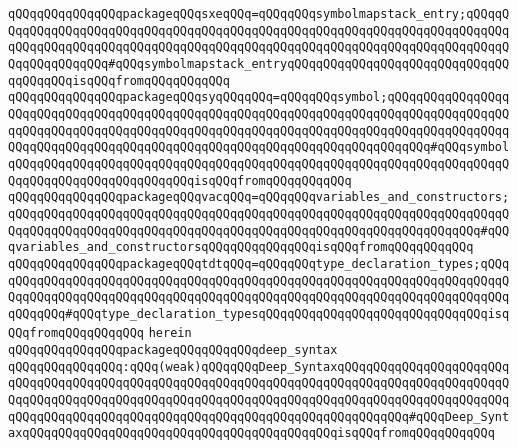 \verb|qQQqqQQqqQQqqQQqpackageqQQqsxeqQQq=qQQqqQQqsymbolmapstack_entry;qQQqqQQqqQQqqQQqqQQqqQQqqQQqqQQqqQQqqQQqqQQqqQQqqQQqqQQqqQQqqQQqqQQqqQQqqQQqqQQqqQQqqQQqqQQqqQQqqQQqqQQqqQQqqQQqqQQqqQQqqQQqqQQqqQQqqQQqqQQqqQQqqQQqqQQqqQQqqQQq#qQQqsymbolmapstack_entryqQQqqQQqqQQqqQQqqQQqqQQqqQQqqQQqqQQqqQQqisqQQqfromqQQqqQQqqQQq|\newline
\verb|qQQqqQQqqQQqqQQqpackageqQQqsyqQQqqQQq=qQQqqQQqsymbol;qQQqqQQqqQQqqQQqqQQqqQQqqQQqqQQqqQQqqQQqqQQqqQQqqQQqqQQqqQQqqQQqqQQqqQQqqQQqqQQqqQQqqQQqqQQqqQQqqQQqqQQqqQQqqQQqqQQqqQQqqQQqqQQqqQQqqQQqqQQqqQQqqQQqqQQqqQQqqQQqqQQqqQQqqQQqqQQqqQQqqQQqqQQqqQQqqQQqqQQqqQQqqQQqqQQqqQQq#qQQqsymbolqQQqqQQqqQQqqQQqqQQqqQQqqQQqqQQqqQQqqQQqqQQqqQQqqQQqqQQqqQQqqQQqqQQqqQQqqQQqqQQqqQQqqQQqqQQqqQQqisqQQqfromqQQqqQQqqQQq|\newline
\verb|qQQqqQQqqQQqqQQqpackageqQQqvacqQQq=qQQqqQQqvariables_and_constructors;qQQqqQQqqQQqqQQqqQQqqQQqqQQqqQQqqQQqqQQqqQQqqQQqqQQqqQQqqQQqqQQqqQQqqQQqqQQqqQQqqQQqqQQqqQQqqQQqqQQqqQQqqQQqqQQqqQQqqQQqqQQqqQQqqQQqqQQq#qQQqvariables_and_constructorsqQQqqQQqqQQqqQQqisqQQqfromqQQqqQQqqQQq|\newline
\verb|qQQqqQQqqQQqqQQqpackageqQQqtdtqQQq=qQQqqQQqtype_declaration_types;qQQqqQQqqQQqqQQqqQQqqQQqqQQqqQQqqQQqqQQqqQQqqQQqqQQqqQQqqQQqqQQqqQQqqQQqqQQqqQQqqQQqqQQqqQQqqQQqqQQqqQQqqQQqqQQqqQQqqQQqqQQqqQQqqQQqqQQqqQQqqQQqqQQqqQQq#qQQqtype_declaration_typesqQQqqQQqqQQqqQQqqQQqqQQqqQQqqQQqisqQQqfromqQQqqQQqqQQq|\newline
\verb|herein|\newline
\newline
\verb|qQQqqQQqqQQqqQQqpackageqQQqqQQqqQQqdeep_syntax|\newline
\verb|qQQqqQQqqQQqqQQq:qQQq(weak)qQQqqQQqDeep_SyntaxqQQqqQQqqQQqqQQqqQQqqQQqqQQqqQQqqQQqqQQqqQQqqQQqqQQqqQQqqQQqqQQqqQQqqQQqqQQqqQQqqQQqqQQqqQQqqQQqqQQqqQQqqQQqqQQqqQQqqQQqqQQqqQQqqQQqqQQqqQQqqQQqqQQqqQQqqQQqqQQqqQQqqQQqqQQqqQQqqQQqqQQqqQQqqQQqqQQqqQQqqQQqqQQqqQQqqQQqqQQq#qQQqDeep_SyntaxqQQqqQQqqQQqqQQqqQQqqQQqqQQqqQQqqQQqqQQqqQQqisqQQqfromqQQqqQQqqQQq|\newline
